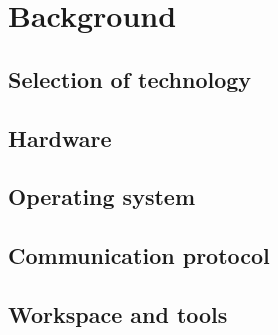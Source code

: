 \section{Background}

\subsection*{Selection of technology}

\subsection{Hardware}

\subsection{Operating system}

\subsection{Communication protocol}

\subsection{Workspace and tools}

